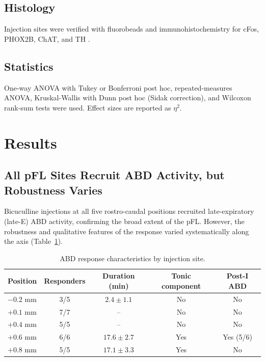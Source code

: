 \documentclass[12pt]{article}
\begin{document}
\subsection{Histology}

Injection sites were verified with fluorobeads and immunohistochemistry for cFos, PHOX2B, ChAT, and TH \citep{stornetta2006phox2b, guyenet2019rtn}.

\subsection{Statistics}

One-way ANOVA with Tukey or Bonferroni post hoc, repeated-measures ANOVA, Kruskal-Wallis with Dunn post hoc (Sidak correction), and Wilcoxon rank-sum tests were used. Effect sizes are reported as $\eta^2$.

\section{Results}

\subsection{All pFL Sites Recruit ABD Activity, but Robustness Varies}

Bicuculline injections at all five rostro-caudal positions recruited late-expiratory (late-E) ABD activity, confirming the broad extent of the pFL. However, the robustness and qualitative features of the response varied systematically along the axis (Table~\ref{tab:abd}).

\begin{table}[htbp]
\centering
\caption{ABD response characteristics by injection site.}
\label{tab:abd}
\begin{tabular}{lcccc}
\toprule
Position & Responders & Duration (min) & Tonic component & Post-I ABD \\
\midrule
$-0.2$ mm & 3/5 & $2.4 \pm 1.1$ & No & No \\
$+0.1$ mm & 7/7 & -- & No & No \\
$+0.4$ mm & 5/5 & -- & No & No \\
$+0.6$ mm & 6/6 & $17.6 \pm 2.7$ & Yes & Yes (5/6) \\
$+0.8$ mm & 5/5 & $17.1 \pm 3.3$ & Yes & No \\
\bottomrule
\end{tabular}
\end{table}
\end{document}
